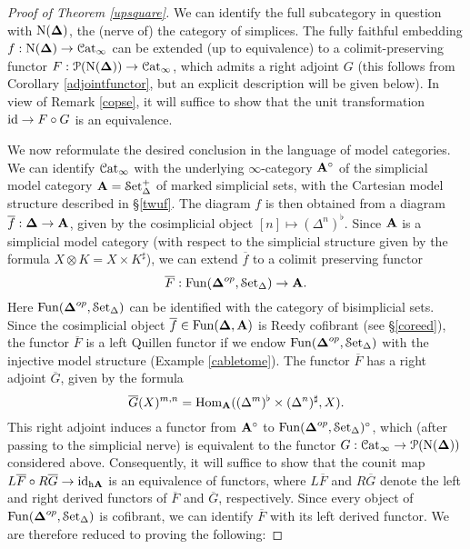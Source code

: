 \begin{proof}[Proof of Theorem \ref{upsquare}]
We can identify the full subcategory in question with $\operatorname{N}( \operatorname{{\bf \Delta}})$, the (nerve of) the category of simplices. The fully faithful embedding $f: \operatorname{N}(\operatorname{{\bf \Delta}}) \rightarrow \operatorname{\mathcal{C}at}_{\infty}$ can be extended (up to equivalence) to a colimit-preserving functor $F: \operatorname{\mathcal{P}}( \operatorname{N}(\operatorname{{\bf \Delta}}) ) \rightarrow \operatorname{\mathcal{C}at}_{\infty}$, which admits a right adjoint $G$ (this follows from Corollary \ref{adjointfunctor}, but an explicit description will be given below). In view of Remark \ref{copse}, it will suffice to show that the unit transformation $\operatorname{id} \rightarrow F \circ G$ is an equivalence.

We now reformulate the desired conclusion in the language of model categories. We can identify
$\operatorname{\mathcal{C}at}_{\infty}$ with the underlying $\infty$-category ${\mathbf A}^{\circ}$ of the simplicial model category
${\mathbf A} = \operatorname{\mathcal{S}et_{\Delta}^{+}}$ of marked simplicial sets, with the Cartesian model structure described in \S \ref{twuf}. The diagram $f$ is then obtained from a diagram $\overline{f}: \operatorname{{\bf \Delta}} \rightarrow {\mathbf A}$, given by the cosimplicial object $[n] \mapsto (\Delta^n)^{\flat}.$
Since ${\mathbf A}$ is a simplicial model category (with respect to the simplicial structure
given by the formula $X \otimes K = X \times K^{\sharp}$), we can extend $\overline{f}$ to a colimit preserving functor
$$\overline{F}: \operatorname{Fun}( \operatorname{{\bf \Delta}}^{op}, \operatorname{\mathcal{S}et_{\Delta}}) \rightarrow {\mathbf A}.$$
Here $\operatorname{Fun}( \operatorname{{\bf \Delta}}^{op}, \operatorname{\mathcal{S}et_{\Delta}})$ can be identified with the category of bisimplicial sets.
Since the cosimplicial object $\overline{f} \in \operatorname{Fun}( \operatorname{{\bf \Delta}}, {\mathbf A})$ is Reedy cofibrant (see \S \ref{coreed}), the functor $\overline{F}$ is a left Quillen functor if we endow $\operatorname{Fun}( \operatorname{{\bf \Delta}}^{op}, \operatorname{\mathcal{S}et_{\Delta}})$ with the injective model structure (Example \ref{cabletome}). The functor $\overline{F}$ has a right adjoint
$\overline{G}$, given by the formula
$$ \overline{G}(X)^{m,n} = \operatorname{Hom}_{ {\mathbf A}}( (\Delta^m)^{\flat} \times (\Delta^n)^{\sharp}, X).$$
This right adjoint induces a functor from ${\mathbf A}^{\circ}$ to $\operatorname{Fun}(\operatorname{{\bf \Delta}}^{op}, \operatorname{\mathcal{S}et_{\Delta}})^{\circ}$, which
(after passing to the simplicial nerve) is equivalent to the functor $G: \operatorname{\mathcal{C}at}_{\infty}
\rightarrow \operatorname{\mathcal{P}}( \operatorname{N}(\operatorname{{\bf \Delta}}))$ considered above. Consequently, it will suffice to show that
the counit map $L \overline{F} \circ R \overline{G} \rightarrow \operatorname{id}_{ \rm{h} \it{{\mathbf A}}}$ is an equivalence of functors, where $L \overline{F}$ and $R \overline{G}$ denote the left and right derived functors of
$\overline{F}$ and $\overline{G}$, respectively. Since every object of $\operatorname{Fun}( \operatorname{{\bf \Delta}}^{op}, \operatorname{\mathcal{S}et_{\Delta}})$ is cofibrant, we can identify $\overline{F}$ with its left derived functor. We are therefore reduced to proving the following:

\end{proof}
